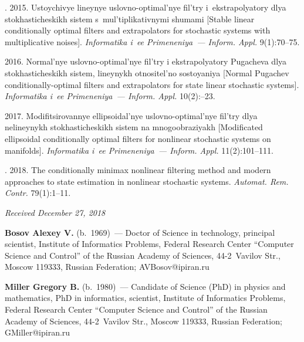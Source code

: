 \begin{multicols}{2}
{{\begin{thebibliography}{99}
. 2015. Ustoychivye lineynye
     uslovno-optimal'nye fil'try i~ekstrapolyatory dlya stokhasticheskikh sistem 
     s~mul'tiplikativnymi shumami [Stable linear conditionally optimal filters and 
extrapolators for stochastic systems with multiplicative noises]. \textit{Informatika i~ee 
Primeneniya~--- Inform. Appl.} 9(1):70--75.

 
 2016. Normal'nye uslovno-optimal'nye 
fil'try i ekstrapolyatory Pugacheva dlya stokhasticheskikh sistem, 
lineynykh otnositel'no so\-sto\-yaniya [Normal Pugachev conditionally-optimal filters 
and extrapolators for state linear stochastic systems]. \textit{Informatika i~ee Primeneniya~--- 
Inform. Appl.} 10(2):--23. 

 2017. 
Modifitsirovannye ellipsoidal'nye uslovno-optimal'nye fil'try dlya nelineynykh 
stokhasticheskikh sistem na mnogoobraziyakh [Modificated ellipsoidal conditionally 
optimal filters for nonlinear stochastic systems on manifolds]. \textit{Informatika i~ee 
Primeneniya~--- Inform. Appl.} 11(2):101--111.

. 
2018. The conditionally minimax nonlinear filtering method and modern 
approaches to state estimation in nonlinear stochastic systems. \textit{Automat. Rem. 
Contr.} 79(1):1--11.
\end{thebibliography}

 }
 }

\end{multicols}

\vspace*{-6pt}

\hfill{\small\textit{Received December 27, 2018}}



    \Contr
    
    \noindent
    \textbf{Bosov Alexey V.} (b.\ 1969)~--- Doctor of Science in technology, 
principal scientist, Institute of Informatics Problems, Federal Research Center 
``Computer Science and Control'' of the Russian Academy of Sciences, 44-2~Vavilov 
Str., Moscow 119333, Russian Federation; \mbox{AVBosov@ipiran.ru}
    
    \vspace*{3pt}
    
    \noindent
    \textbf{Miller Gregory B.} (b.\ 1980)~---
    Candidate of Science (PhD) in physics and mathematics, PhD in informatics, 
scientist, Institute of Informatics Problems, Federal Research Center ``Computer 
Science and Control'' of the Russian Academy of Sciences, 44-2~Vavilov Str., 
Moscow 119333, Russian Federation; \mbox{GMiller@ipiran.ru}

\label{end\stat}

\renewcommand{\bibname}{\protect\rm Литература}        